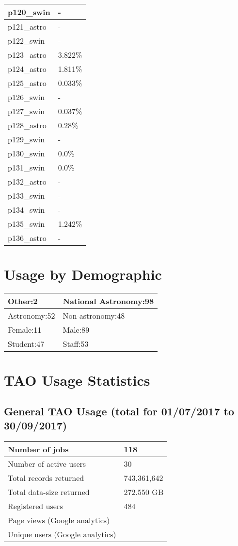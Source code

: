\documentclass{article}%
\begin{document}
\begin{longtabu}{X[l] X[r]}
\hline%
p120\_swin&{-}\\%
\hline%
p121\_astro&{-}\\%
\hline%
p122\_swin&{-}\\%
\hline%
p123\_astro&3.822\%\\%
\hline%
p124\_astro&1.811\%\\%
\hline%
p125\_astro&0.033\%\\%
\hline%
p126\_swin&{-}\\%
\hline%
p127\_swin&0.037\%\\%
\hline%
p128\_astro&0.28\%\\%
\hline%
p129\_swin&{-}\\%
\hline%
p130\_swin&0.0\%\\%
\hline%
p131\_swin&0.0\%\\%
\hline%
p132\_astro&{-}\\%
\hline%
p133\_swin&{-}\\%
\hline%
p134\_swin&{-}\\%
\hline%
p135\_swin&1.242\%\\%
\hline%
p136\_astro&{-}\\%
\hline%
\end{longtabu}%
\section{Usage by Demographic}%

%
\begin{longtabu}{X[l] X[l]}%
Other:2&National Astronomy:98\\%
\hline%
Astronomy:52&Non{-}astronomy:48\\%
\hline%
Female:11&Male:89\\%
\hline%
Student:47&Staff:53\\%
\hline%
\end{longtabu}%
\newpage%
\section{TAO Usage Statistics}%

%
\subsection{General TAO Usage (total for 01/07/2017 to 30/09/2017)}%

%
\begin{longtabu}{X[l] X[l]}%
Number of jobs&118\\%
\hline%
Number of active users&30\\%
\hline%
Total records returned&743,361,642\\%
\hline%
Total data{-}size returned&272.550 GB\\%
\hline%
Registered users&484\\%
\hline%
Page views (Google analytics)&\\%
\hline%
Unique users (Google analytics)&\\%
\hline%
\end{longtabu}%
\end{document}
